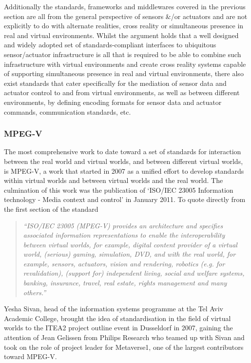 Additionally the standards, frameworks and middlewares covered in the previous section are all from the general perspective of sensors \&/or actuators and are not explicitly to do with alternate realities, cross reality or simultaneous presence in real and virtual environments. Whilst the argument holds that a well designed and widely adopted set of standards-compliant interfaces to ubiquitous sensor/actuator infrastructure is all that is required to be able to combine such infrastructure with virtual environments and create cross reality systems capable of supporting simultaneous presence in real and virtual environments, there also exist standards that cater specifically for the mediation of sensor data and actuator control to and from virtual environments, as well as between different environments, by defining encoding formats for sensor data and actuator commands, communication standards, etc.

\subsubsection{MPEG-V}
The most comprehensive work to date toward a set of standards for interaction between the real world and virtual worlds, and between different virtual worlds, is MPEG-V, a work that started in 2007 as a unified effort to develop standards within virtual worlds and between virtual worlds and the real world. The culmination of this work was the publication of `ISO/IEC 23005 Information technology - Media context and control' in January 2011. To quote directly from the first section of the standard

\begin{quote}
\textit{``ISO/IEC 23005 (MPEG-V) provides an architecture and specifies associated information representations to enable the interoperability between virtual worlds, for example, digital content provider of a virtual world, (serious) gaming, simulation, DVD, and with the real world, for example, sensors, actuators, vision and rendering, robotics (e.g. for revalidation), (support for) independent living, social and welfare systems, banking, insurance, travel, real estate, rights management and many others.''}~\cite{InternationalOrganizationforStandardization2011}
\end{quote}

Yesha Sivan, head of the information systems programme at the Tel Aviv Academic College, brought the idea of standardisation in the field of virtual worlds to the ITEA2 project outline event in Dusseldorf in 2007, gaining the attention of Jean Gelissen from Philips Research who teamed up with Sivan and took on the role of project leader for Metaverse1, one of the largest contributors toward MPEG-V.


